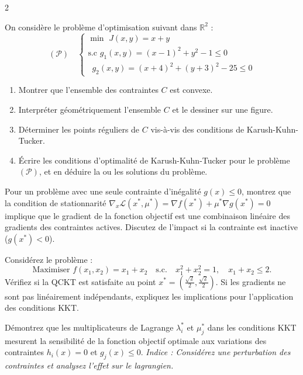 \begin{multicols}{2}
\begin{exo}
	On considère le problème d'optimisation suivant dans $\mathbb{R}^{2}$ :
	\[
	(\mathcal{P}) \quad
	\begin{cases}
	\min \,\, J(x, y) = x + y \\
	\text{s.c} \,\, g_{1}(x, y) = (x - 1)^{2} + y^{2} - 1 \leqslant 0 \\
	\,\,\,g_{2}(x, y) = (x + 4)^{2} + (y + 3)^{2} - 25 \leqslant 0
	\end{cases}
	\]
	\begin{enumerate}[label=\arabic*.]
		\item Montrer que l'ensemble des contraintes $C$ est convexe.
		\item Interpréter géométriquement l'ensemble $C$ et le dessiner sur une figure.
		\item Déterminer les points réguliers de $C$ vis-à-vis des conditions de Karush-Kuhn-Tucker.
		\item Écrire les conditions d'optimalité de Karush-Kuhn-Tucker pour le problème $(\mathcal{P})$, et en déduire la ou les solutions du problème.
	\end{enumerate}
\end{exo}

\begin{exo}
	Pour un problème avec une seule contrainte d'inégalité \( g(x) \leq 0 \), montrez que la condition de stationnarité \( \nabla_x \mathcal{L}(x^*, \mu^*) = \nabla f(x^*) + \mu^* \nabla g(x^*) = 0 \) implique que le gradient de la fonction objectif est une combinaison linéaire des gradients des contraintes actives. Discutez de l'impact si la contrainte est inactive (\( g(x^*) < 0 \)).
\end{exo}

\begin{exo}
	Considérez le problème :
	\[
	\text{Maximiser } f(x_1, x_2) = x_1 + x_2 \quad \text{s.c.} \quad x_1^2 + x_2^2 = 1, \quad x_1 + x_2 \leq 2.
	\]
	Vérifiez si la QCKT est satisfaite au point \( x^* = \left( \frac{\sqrt{2}}{2}, \frac{\sqrt{2}}{2} \right) \). Si les gradients ne sont pas linéairement indépendants, expliquez les implications pour l'application des conditions KKT.
\end{exo}

\begin{exo}
	Démontrez que les multiplicateurs de Lagrange \( \lambda_i^* \) et \( \mu_j^* \) dans les conditions KKT mesurent la sensibilité de la fonction objectif optimale aux variations des contraintes \( h_i(x) = 0 \) et \( g_j(x) \leq 0 \). \textit{Indice : Considérez une perturbation des contraintes et analysez l'effet sur le lagrangien.}
\end{exo}


\end{multicols}
